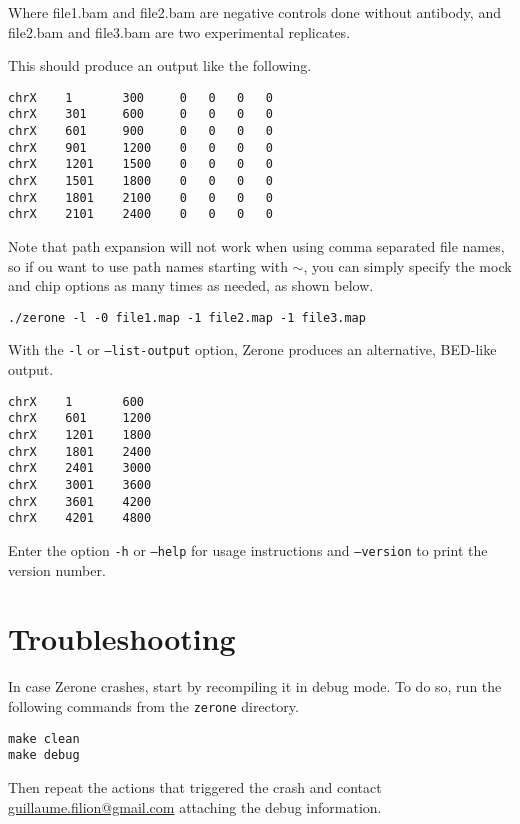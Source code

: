 \documentclass[12pt]{article}
\begin{document}
Where file1.bam and file2.bam are negative controls done without antibody,
and file2.bam and file3.bam are two experimental replicates.

This should produce an output like the following.

\begin{verbatim}
chrX    1       300     0   0   0   0
chrX    301     600     0   0   0   0
chrX    601     900     0   0   0   0
chrX    901     1200    0   0   0   0
chrX    1201    1500    0   0   0   0
chrX    1501    1800    0   0   0   0
chrX    1801    2100    0   0   0   0
chrX    2101    2400    0   0   0   0
\end{verbatim}

Note that path expansion will not work when using comma separated file names,
so if ou want to use path names starting with $\sim$, you can simply
specify the mock and chip options as many times as needed, as shown below.

\begin{verbatim}
./zerone -l -0 file1.map -1 file2.map -1 file3.map
\end{verbatim}

\pagebreak%
With the \texttt{-l} or \texttt{--list-output} option, Zerone produces an
alternative, BED-like output.

\begin{verbatim}
chrX    1       600
chrX    601     1200
chrX    1201    1800
chrX    1801    2400
chrX    2401    3000
chrX    3001    3600
chrX    3601    4200
chrX    4201    4800
\end{verbatim}


Enter the option \texttt{-h} or \texttt{--help} for usage instructions and
\texttt{--version} to print the version number.

\section{Troubleshooting}

In case Zerone crashes, start by recompiling it in debug mode. To do so,
run the following commands from the \texttt{zerone} directory.

\begin{verbatim}
make clean
make debug
\end{verbatim}

Then repeat the actions that triggered the crash and contact
\href{mailto:guillaume.filion@gmail.com}{guillaume.filion@gmail.com}
attaching the debug information.

\end{document}
